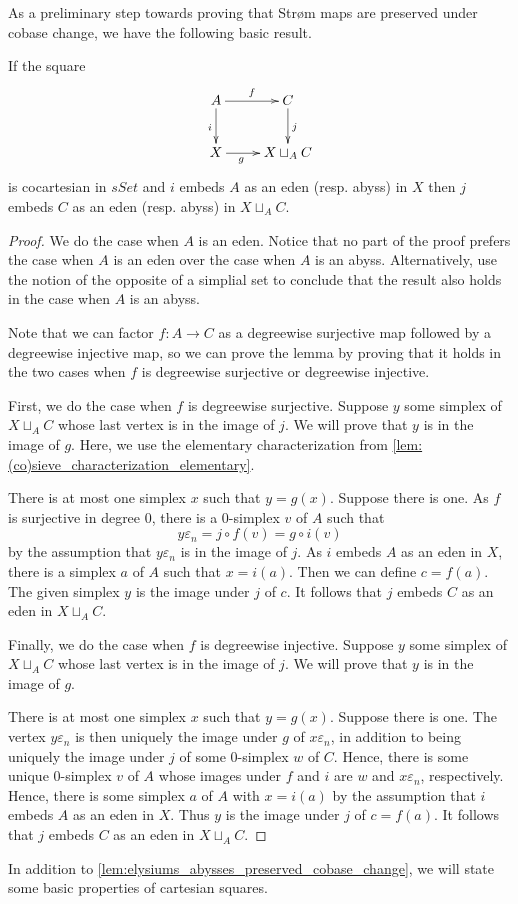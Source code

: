 As a preliminary step towards proving that Str\o m maps are preserved under cobase change, we have the following basic result.
\begin{lemma}\label{lem:elysiums_abysses_preserved_cobase_change}
If the square
\begin{displaymath}
\xymatrix{
A \ar[d]_i \ar[r]^f & C \ar[d]^j \\
X \ar[r]_(.35)g & X\sqcup _AC
}
\end{displaymath}
is cocartesian in $sSet$ and $i$ embeds $A$ as an eden (resp. abyss) in $X$ then $j$ embeds $C$ as an eden (resp. abyss) in $X\sqcup _AC$.
\end{lemma}
\begin{proof}
We do the case when $A$ is an eden. Notice that no part of the proof prefers the case when $A$ is an eden over the case when $A$ is an abyss. Alternatively, use the notion of the opposite \cite[Def.~2.2.19, p.~ 42]{WJR13} of a simplial set to conclude that the result also holds in the case when $A$ is an abyss.

Note that we can factor $f:A\to C$ as a degreewise surjective map followed by a degreewise injective map, so we can prove the lemma by proving that it holds in the two cases when $f$ is degreewise surjective or degreewise injective.

First, we do the case when $f$ is degreewise surjective. Suppose $y$ some simplex of $X\sqcup _AC$ whose last vertex is in the image of $j$. We will prove that $y$ is in the image of $g$. Here, we use the elementary characterization from \cref{lem:(co)sieve_characterization_elementary}.

There is at most one simplex $x$ such that $y=g(x)$. Suppose there is one. As $f$ is surjective in degree $0$, there is a $0$-simplex $v$ of $A$ such that
\[y\varepsilon _n=j\circ f(v)=g\circ i(v)\]
by the assumption that $y\varepsilon _n$ is in the image of $j$. As $i$ embeds $A$ as an eden in $X$, there is a simplex $a$ of $A$ such that $x=i(a)$. Then we can define $c=f(a)$. The given simplex $y$ is the image under $j$ of $c$. It follows that $j$ embeds $C$ as an eden in $X\sqcup _AC$.

Finally, we do the case when $f$ is degreewise injective. Suppose $y$ some simplex of $X\sqcup _AC$ whose last vertex is in the image of $j$. We will prove that $y$ is in the image of $g$.

There is at most one simplex $x$ such that $y=g(x)$. Suppose there is one. The vertex $y\varepsilon _n$ is then uniquely the image under $g$ of $x\varepsilon _n$, in addition to being uniquely the image under $j$ of some $0$-simplex $w$ of $C$. Hence, there is some unique $0$-simplex $v$ of $A$ whose images under $f$ and $i$ are $w$ and $x\varepsilon _n$, respectively. Hence, there is some simplex $a$ of $A$ with $x=i(a)$ by the assumption that $i$ embeds $A$ as an eden in $X$. Thus $y$ is the image under $j$ of $c=f(a)$. It follows that $j$ embeds $C$ as an eden in $X\sqcup _AC$.
\end{proof}
\noindent In addition to \cref{lem:elysiums_abysses_preserved_cobase_change}, we will state some basic properties of cartesian squares.

